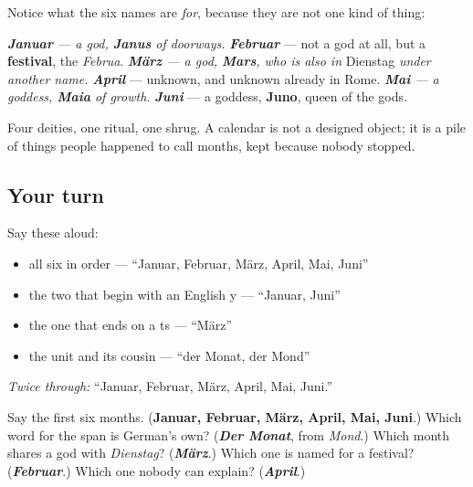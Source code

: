 \begin{culture}
Notice what the six names are \emph{for}, because they are not one kind of thing:

\emph{ \emph{\textbf{Januar}} — a god, \textbf{Janus} of doorways. } \emph{\textbf{Februar}} — not a god at all, but a \textbf{festival}, the \emph{Februa}. \emph{ \emph{\textbf{März}} — a god, \textbf{Mars}, who is also in }Dienstag\emph{ under another name. } \emph{\textbf{April}} — unknown, and unknown already in Rome. \emph{ \emph{\textbf{Mai}} — a goddess, \textbf{Maia} of growth. } \emph{\textbf{Juni}} — a goddess, \textbf{Juno}, queen of the gods.

Four deities, one ritual, one shrug. A calendar is not a designed object; it is a pile of things people happened to call months, kept because nobody stopped.
\end{culture}

\subsection*{Your turn}
Say these aloud:

\begin{itemize}
\raggedright
  \item all six in order — \textquotedblleft{}Januar, Februar, März, April, Mai, Juni\textquotedblright{}
  \item the two that begin with an English y — \textquotedblleft{}Januar, Juni\textquotedblright{}
  \item the one that ends on a ts — \textquotedblleft{}März\textquotedblright{}
  \item the unit and its cousin — \textquotedblleft{}der Monat, der Mond\textquotedblright{}
\end{itemize}

\emph{Twice through:} \textquotedblleft{}Januar, Februar, März, April, Mai, Juni.\textquotedblright{}

\begin{tcolorbox}[breakable,colback=teal!4,colframe=teal!35!black,title={Before you move on}]
Say the first six months. (\textbf{Januar, Februar, März, April, Mai, Juni}.) Which word for the span is German's own? (\emph{\textbf{Der Monat}}, from \emph{Mond}.) Which month shares a god with \emph{Dienstag}? (\emph{\textbf{März}}.) Which one is named for a festival? (\emph{\textbf{Februar}}.) Which one nobody can explain? (\emph{\textbf{April}}.)
\end{tcolorbox}
